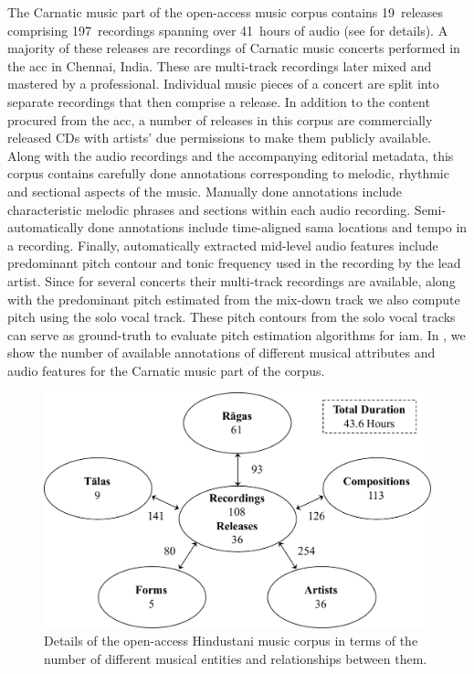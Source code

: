 The Carnatic music part of the open-access music corpus contains 19~releases comprising 197~recordings spanning over 41~hours of audio (see  for details). A majority of these releases are recordings of Carnatic music concerts performed in the \gls{acc} in Chennai, India. These are multi-track recordings later mixed and mastered by a professional. Individual music pieces of a concert are split into separate recordings that then comprise a release. In addition to the content procured from the \gls{acc}, a number of releases in this corpus are commercially released CDs with artists' due permissions to make them publicly available. Along with the audio recordings and the accompanying editorial metadata, this corpus contains carefully done annotations corresponding to melodic, rhythmic and sectional aspects of the music. Manually done annotations include characteristic melodic phrases and sections within each audio recording. Semi-automatically done annotations include time-aligned sama locations and tempo in a recording. Finally, automatically extracted mid-level audio features include predominant pitch contour and tonic frequency used in the recording by the lead artist. Since for several concerts their multi-track recordings are available, along with the predominant pitch estimated from the mix-down track we also compute pitch using the solo vocal track. These pitch contours from the solo vocal tracks can serve as ground-truth to evaluate pitch estimation algorithms for \gls{iam}. In , we show the number of available annotations of different musical attributes and audio features for the Carnatic music part of the corpus.


\begin{figure}
	\begin{center}
		\includegraphics[width=\figSizeNinety]{ch04_datasets/figures/hindustani_corpus_cc.pdf}
	\end{center}
	\caption[Details of the open-access Hindustani music corpus]{Details of the open-access Hindustani music corpus in terms of the number of different musical entities and relationships between them.}
	\label{fig:hindustani_cc_corpus_details}
\end{figure}

